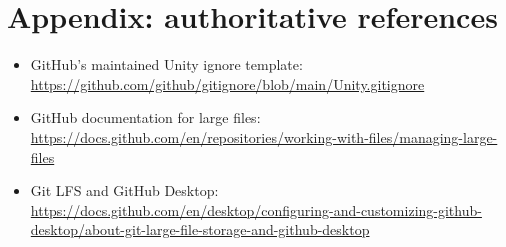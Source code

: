 \documentclass[11pt,a4paper]{article}
\begin{document}
\section*{Appendix: authoritative references}

\begin{itemize}
\item GitHub's maintained Unity ignore template:\\
\url{https://github.com/github/gitignore/blob/main/Unity.gitignore}
\item GitHub documentation for large files:\\
\url{https://docs.github.com/en/repositories/working-with-files/managing-large-files}
\item Git LFS and GitHub Desktop:\\
\url{https://docs.github.com/en/desktop/configuring-and-customizing-github-desktop/about-git-large-file-storage-and-github-desktop}
\end{itemize}
\end{document}
